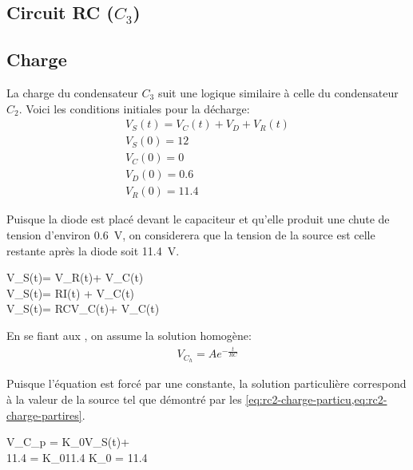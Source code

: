 \documentclass[a11paper, 11pt]{article}
\newcommand{\ddt}[1]{\frac{\text{d}^{#1}}{\text{d}t^{#1}}}
\newcommand{\vct}{V_C(t)}
\newcommand{\vrt}{V_R(t)}
\newcommand{\vst}{V_S(t)}
\begin{document}
\begin{appendix}
	\newpage
	\section{Circuit RC (\texorpdfstring{$C_3$}{TEXT})}
	\subsection{Charge}
	La charge du condensateur $C_3$ suit une logique similaire à celle du condensateur $C_2$.
	Voici les conditions initiales pour la décharge:
	\begin{gather}
		\vst = \vct + V_D + \vrt \label{eq:rc2-charge-base}\\
		V_S(0) = 12\\
		V_C(0) = 0 \\
		V_D(0) = 0.6\\
		V_R(0) = 11.4
	\end{gather}

	Puisque la diode est placé devant le capaciteur et qu'elle produit une chute de tension
	d'environ \SI{0.6}{\V}, on considerera que la tension de la source est celle restante
	après la diode soit \SI{11.4}{\V}.

	\begin{DispWithArrows}[format=c]
		\vst = \vrt + \vct {} \\
		\vst = RI(t) + \vct {} \\
		\vst = RC\ddt{}\vct + \vct
	\end{DispWithArrows}

	En se fiant aux ,
	on assume la solution homogène:
	\begin{gather}
		V_{C_h} = Ae^{-\frac{t}{RC}}
	\end{gather}

	Puisque l'équation est forcé par une constante, la solution particulière correspond à
	la valeur de la source tel que démontré par les \cref{eq:rc2-charge-particu,eq:rc2-charge-partires}.

	\begin{DispWithArrows}[format=c]
		V_{C_p} = K_0\vst + \cancelto{0}{K_1\ddt{}\vst}
		\label{eq:rc2-charge-particu}\\
		11.4 = K_011.4 \Rightarrow K_0 = 11.4 \label{eq:rc2-charge-partires}
	\end{DispWithArrows}


\end{appendix}
\end{document}
